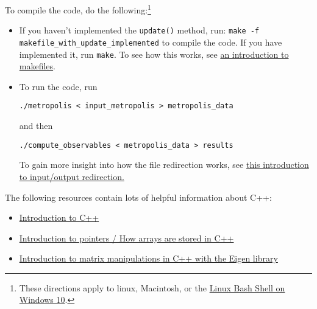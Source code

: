 \documentclass[11pt]{article}
\begin{document}
\label{sec:editing_and_running}

To compile the code, do the following:\footnote{These directions apply to linux, Macintosh, or the \href{https://www.howtogeek.com/249966/how-to-install-and-use-the-linux-bash-shell-on-windows-10/}{Linux Bash Shell on Windows 10}.}

\begin{itemize}
\item If you haven't implemented the \lstinline{update()} method, run:  \lstinline{make -f makefile_with_update_implemented} to compile the code. If you have implemented it, run \lstinline{make}. To see how this works, see \href{https://www.google.com/search?q=introduction+fo+makefile&rlz=1C1CHBF_enUS719US719&oq=introduction+fo+makefile&aqs=chrome..69i57j0l5.2041j0j1&sourceid=chrome&ie=UTF-8}{an introduction to makefiles}. %
\item To run the code, run \begin{center}\lstinline{./metropolis < input_metropolis > metropolis_data}\end{center} and then \begin{center}\lstinline{./compute_observables < metropolis_data > results}\end{center} To gain more insight into how the file redirection works, see \href{https://www.digitalocean.com/community/tutorials/an-introduction-to-linux-i-o-redirection}{this introduction to input/output redirection.} %
\end{itemize}

The following resources contain lots of helpful information about C++:
\begin{itemize}
\item \href{http://www.cplusplus.com/doc/tutorial/}{Introduction to C++}
\item \href{http://www.cplusplus.com/doc/tutorial/arrays/}{Introduction to pointers  / How arrays are stored in C++}
\item \href{https://eigen.tuxfamily.org/dox/GettingStarted.html}{Introduction to matrix manipulations in C++ with the Eigen library}
\end{itemize}



\end{document}
